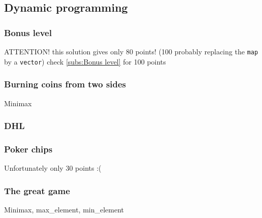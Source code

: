 \documentclass[10pt,a4paper,landscape,twocolumn,twoside]{article}
\begin{document}
	\newpage
	\subsection{Dynamic programming}

		\subsubsection{Bonus level}
		\label{subs:Bonus level DP}
		\begin{keywords}\end{keywords}
		ATTENTION! this solution gives only 80 points! (100 probably replacing the \texttt{map} by a \texttt{vector}) check \ref{subs:Bonus level} for 100 points
		

		\subsubsection{Burning coins from two sides}
		\label{subs:Burning coins from two sides}
		\begin{keywords}Minimax\end{keywords}
		

		\subsubsection{DHL}
		

		\subsubsection{Poker chips}
		Unfortunately only 30 points :(
		

		\subsubsection{The great game}
		\begin{keywords}Minimax, max\_element, min\_element\end{keywords}
		
\end{document}
